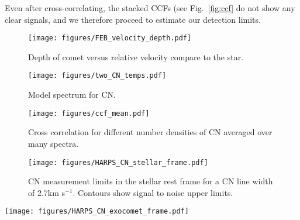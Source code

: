 \documentclass{aa}
\newcommand{\kms}{km s$^{-1}$}
\begin{document}
Even after cross-correlating, the stacked CCFs (see Fig.~\ref{fig:ccf} do not show any clear signals, and we therefore proceed to estimate our detection limits.


\begin{figure}
    \begin{centering}
        \texttt{[image: figures/FEB\_velocity\_depth.pdf]}
        \caption{Depth of comet versus relative velocity compare to the star.}
        \label{fig:FEB_velocity}
    \end{centering}
\end{figure}


\begin{figure}
    \begin{centering}
        \texttt{[image: figures/two\_CN\_temps.pdf]}
        \caption{Model spectrum for CN.}
        \label{fig:CN_theory}
    \end{centering}
\end{figure}

\begin{figure}
    \begin{centering}
        \texttt{[image: figures/ccf\_mean.pdf]}
        \caption{Cross correlation for different number densities of CN averaged over many spectra.}
        \label{fig:ccf_mean}
    \end{centering}
\end{figure}

\begin{figure}
    \begin{centering}
        \texttt{[image: figures/HARPS\_CN\_stellar\_frame.pdf]}
        \caption{CN measurement limits in the stellar rest frame for a CN line width of 2.7\kms{}. Contours show signal to noise upper limits.}
        \label{fig:CN_stellar_frame}
    \end{centering}
\end{figure}



\begin{figure*}
    \begin{centering}
        \texttt{[image: figures/HARPS\_CN\_exocomet\_frame.pdf]}
        \caption{CN measurement limits in the exocomet frame for a CN line width of 2.7, 10 and 20\kms{}. Contours show signal to noise upper limits.}
        \label{fig:CN_exocomet_frame}
    \end{centering}
\end{figure*}
\end{document}
